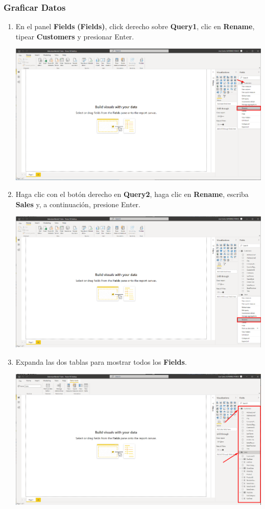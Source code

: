 \documentclass[12pt,letterpaper]{article}
\newcommand\tab[1][1cm]{\hspace*{#1}}
\begin{document}
    \subsubsection{Graficar Datos}
    \begin{enumerate}[\tab 1.]
        \item En el panel \textbf{Fields} \textbf{(Fields)}, click derecho sobre \textbf{Query1}, clic en \textbf{Rename}, tipear \textbf{Customers} y presionar Enter.
        \begin{center}
            \includegraphics[width=13cm]{./img/img14.png}
        \end{center}
        \item Haga clic con el botón derecho en \textbf{Query2}, haga clic en \textbf{Rename}, escriba \textbf{Sales} y, a continuación, presione Enter.
        \begin{center}
            \includegraphics[width=13cm]{./img/img15.png}
        \end{center}
        \item Expanda las dos tablas para mostrar todos los \textbf{Fields}.
        \begin{center}
            \includegraphics[width=13cm]{./img/img16.png}

\end{center}
\end{enumerate}
\end{document}
